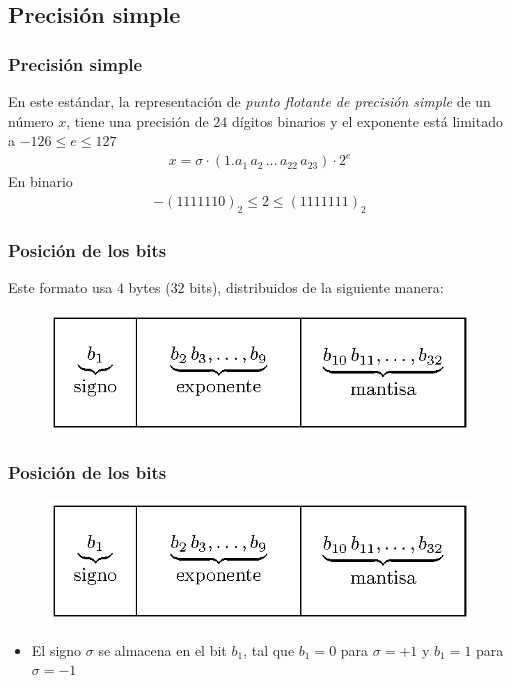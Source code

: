 \subsection{Precisión simple}
\begin{frame}
\frametitle{Precisión simple}
En este estándar, la representación de \emph{punto flotante de precisión simple} de un número $x$, tiene una precisión de $24$ dígitos binarios y el exponente está limitado a $-126 \leq e \leq 127$
\begin{align*}
x = \sigma \cdot (1.a_{1} \, a_{2} \, \ldots \, a_{22} \, a_{23}) \cdot 2^{e}
\end{align*}
En binario
\begin{align*}
-(1111110)_{2} \leq 2 \leq (1111111)_{2}
\end{align*}
\end{frame}
\begin{frame}
\frametitle{Posición de los bits}
Este formato usa $4$ bytes ($32$  bits), distribuidos de la siguiente manera:
\begin{figure}
    \centering
    \includegraphics[scale=1.2]{Imagenes/precision_simple.eps}
\end{figure}
\end{frame}
\begin{frame}
\frametitle{Posición de los bits}
\begin{figure}
    \centering
    \includegraphics[scale=1.2]{Imagenes/precision_simple.eps}
\end{figure}
\begin{itemize}[<+->]
\item El signo $\sigma$ se almacena en el bit $b_{1}$, tal que $b_{1} = 0$ para $\sigma = +1$ y $b_{1} = 1$ para $\sigma = -1$
\end{itemize}
\end{frame}
